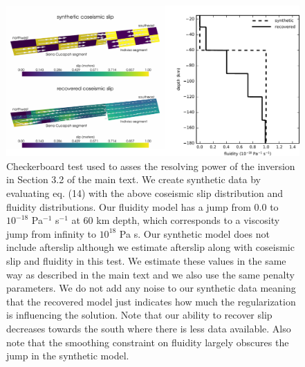 \documentclass[draft,jgrga]{agutex}
\begin{document}
\begin{figure}
\noindent\includegraphics[scale=1.0]{Figures/CheckerBoard}
\caption{
Checkerboard test used to asses the resolving power of the inversion in Section 3.2 of the main text.  We create synthetic data by evaluating eq. (14) with the above coseismic slip distribution and fluidity distributions. Our fluidity model has a jump from 0.0 to $10^{-18}$ Pa$^{-1}$ s$^{-1}$ at 60 km depth, which corresponds to a viscosity jump from infinity to $10^{18}$ Pa s.  
Our synthetic model does not include afterslip although we estimate afterslip along with coseismic slip and fluidity in this test.  We estimate these values in the same way as described in the main text and we also use the same penalty parameters.  We do not add any noise to our synthetic data meaning that the recovered model just indicates how much the regularization is influencing the solution.  Note that our ability to recover slip decreases towards the south where there is less data available.  Also note that the smoothing constraint on fluidity largely obscures the jump in the synthetic model.
}
\label{fig:S2}
\end{figure}
\end{document}
